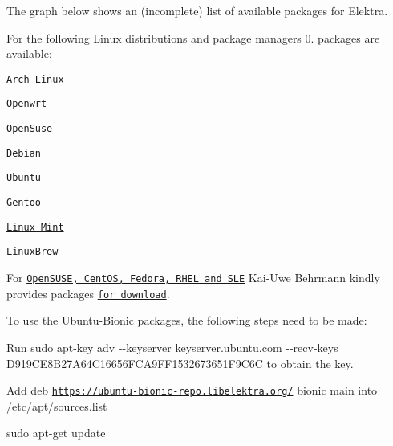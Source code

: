 The graph below shows an (incomplete) list of available packages for Elektra.

\href{https://repology.org/metapackage/elektra/versions}{\tt }

For the following Linux distributions and package managers 0. packages are available\+:


\begin{DoxyItemize}
\item \href{https://aur.archlinux.org/packages/elektra/}{\tt Arch Linux}
\item \href{https://github.com/openwrt/packages/tree/master/libs/elektra}{\tt Openwrt}
\item \href{https://software.opensuse.org/package/elektra}{\tt Open\+Suse}
\item \href{https://packages.debian.org/de/jessie/libelektra4}{\tt Debian}
\item \href{https://launchpad.net/ubuntu/+source/elektra}{\tt Ubuntu}
\item \href{http://packages.gentoo.org/package/app-admin/elektra}{\tt Gentoo}
\item \href{https://community.linuxmint.com/software/view/elektra-bin}{\tt Linux Mint}
\item \href{https://github.com/Linuxbrew/homebrew-core/blob/master/Formula/elektra.rb}{\tt Linux\+Brew}
\end{DoxyItemize}

For \href{https://build.opensuse.org/package/show/home:bekun:devel/elektra}{\tt Open\+S\+U\+SE, Cent\+OS, Fedora, R\+H\+EL and S\+LE} Kai-\/\+Uwe Behrmann kindly provides packages \href{http://software.opensuse.org/download.html?project=home%3Abekun%3Adevel&package=libelektra4}{\tt for download}.

To use the Ubuntu-\/\+Bionic packages, the following steps need to be made\+:


\begin{DoxyEnumerate}
\item Run {\ttfamily sudo apt-\/key adv -\/-\/keyserver keyserver.\+ubuntu.\+com -\/-\/recv-\/keys D919\+C\+E8\+B27\+A64\+C16656\+F\+C\+A9\+F\+F1532673651\+F9\+C6C} to obtain the key.
\item Add {\ttfamily deb \href{https://ubuntu-bionic-repo.libelektra.org/}{\tt https\+://ubuntu-\/bionic-\/repo.\+libelektra.\+org/} bionic main} into {\ttfamily /etc/apt/sources.list}
\item {\ttfamily sudo apt-\/get update}
\end{DoxyEnumerate}

